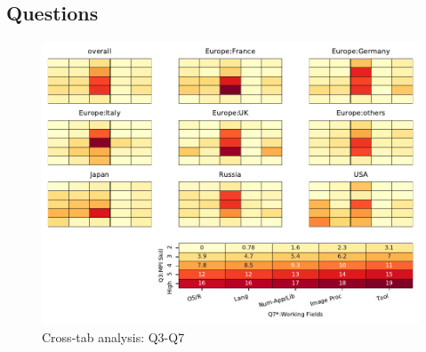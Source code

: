 
\subsection{Questions}


\begin{figure}
\begin{center}
\includegraphics[width=12cm]{../pdfs/Q3-Q7.pdf}
\caption{Cross-tab analysis: Q3-Q7}
\label{fig:Q3-Q7}
\end{center}
\end{figure}
